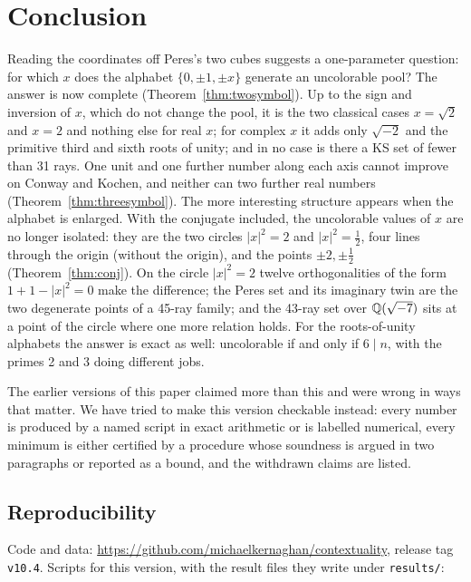 \section{Conclusion}\label{sec:conclusion}

Reading the coordinates off Peres's two cubes suggests a one-parameter question: for which $x$
does the alphabet $\{0,\pm1,\pm x\}$ generate an uncolorable pool?  The answer is now complete
(Theorem~\ref{thm:twosymbol}).  Up to the sign and inversion of $x$, which do not change the pool, it is the two classical cases
$x=\sqrt2$ and $x=2$ and nothing else for real $x$; for complex $x$ it adds only $\sqrt{-2}$ and
the primitive third and sixth roots of unity; and in no case is there a KS set of fewer than 31 rays.  One unit and one
further number along each axis cannot improve on Conway and Kochen, and neither can two further
real numbers (Theorem~\ref{thm:threesymbol}).  The more interesting
structure appears when the alphabet is enlarged.  With the conjugate
included, the uncolorable values of $x$ are no longer isolated: they are the two circles
$|x|^2=2$ and $|x|^2=\tfrac12$, four lines through the origin (without the origin), and the points
$\pm2,\pm\tfrac12$ (Theorem~\ref{thm:conj}).  On the circle $|x|^2=2$ twelve orthogonalities of the form $1+1-|x|^2=0$ make the difference; the Peres set
and its imaginary twin are the two degenerate points of a 45-ray family; and the 43-ray set over
$\mathbb{Q}(\sqrt{-7})$ sits at a point of the circle where one more relation holds.  For the
roots-of-unity alphabets the answer is exact as well: uncolorable if and only if $6\mid n$, with
the primes 2 and 3 doing different jobs.

The earlier versions of this paper claimed more than this and were wrong in ways that matter.
We have tried to make this version checkable instead: every number is produced by a named script
in exact arithmetic or is labelled numerical, every minimum is either certified by a procedure
whose soundness is argued in two paragraphs or reported as a bound, and the withdrawn claims are
listed.

\subsection*{Reproducibility}

Code and data: \url{https://github.com/michaelkernaghan/contextuality}, release tag
\texttt{v10.4}.  Scripts for this
version, with the result files they write under \texttt{results/}:

